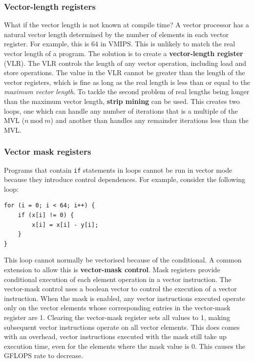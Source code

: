 \documentclass[11pt]{article}
\begin{document}
\subsubsection{Vector-length registers}
What if the vector length is not known at compile time? 
\n
A vector processor has a natural vector length determined by the number of elements in each vector register. For example, this is 64 in VMIPS. This is unlikely to match the real vector length of a program.
\n
The solution is to create a \textbf{vector-length register} (VLR). The VLR controls the length of any vector operation, including load and store operations. The value in the VLR cannot be greater than the length of the vector registers, which is fine as long as the real length is less than or equal to the \textit{maximum vector length}. 
\n
To tackle the second problem of real lengths being longer than the maximum vector length, \textbf{strip mining} can be used. This creates two loops, one which can handle any number of iterations that is a multiple of the MVL ($n\ \text{mod}\ m$) and another than handles any remainder iterations less than the MVL. 

\subsubsection{Vector mask registers}
Programs that contain \texttt{if} statements in loops cannot be run in vector mode because they introduce control dependences. For example, consider the following loop:
\begin{lstlisting}
for (i = 0; i < 64; i++) {
	if (x[i] != 0) {
		x[i] = x[i] - y[i];
	}
}	
\end{lstlisting}
This loop cannot normally be vectorised because of the conditional. A common extension to allow this is \textbf{vector-mask control}. Mask registers provide conditional execution of each element operation in a vector instruction. The vector-mask control uses a boolean vector to control the execution of a vector instruction. When the mask is enabled, any vector instructions executed operate only on the vector elements whose corresponding entries in the vector-mask register are 1. Clearing the vector-mask register sets all values to 1, making subsequent vector instructions operate on all vector elements. 
\n
This does comes with an overhead, vector instructions executed with the mask still take up execution time, even for the elements where the mask value is 0. This causes the GFLOPS rate to decrease.
\end{document}
